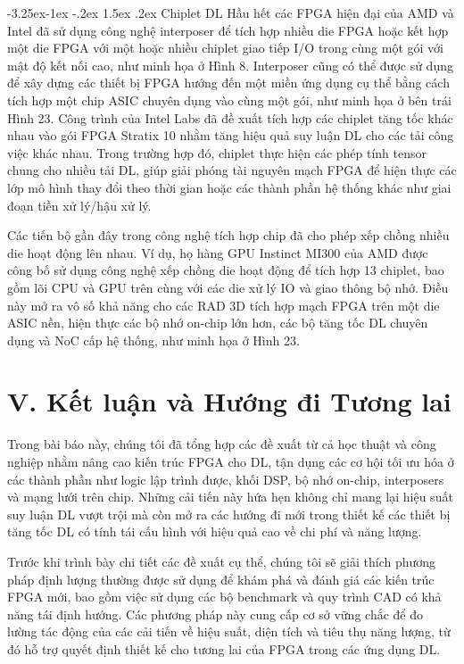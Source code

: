 \documentclass[a4paper]{article}
\makeatletter
\newcounter {subsubsubsection}[subsubsection]
\newcommand\subsubsubsection{\@startsection{subsubsubsection}{4}{\z@}%
                                     {-3.25ex\@plus -1ex \@minus -.2ex}%
                                     {1.5ex \@plus .2ex}%
                                     {\normalfont\normalsize\bfseries}}
\makeatother
\begin{document}
\subsubsubsection{Chiplet DL}
Hầu hết các FPGA hiện đại của AMD và Intel đã sử dụng công nghệ interposer để tích hợp nhiều die FPGA hoặc kết hợp một die FPGA với một hoặc nhiều chiplet giao tiếp I/O trong cùng một gói với mật độ kết nối cao, như minh họa ở Hình 8. Interposer cũng có thể được sử dụng để xây dựng các thiết bị FPGA hướng đến một miền ứng dụng cụ thể bằng cách tích hợp một chip ASIC chuyên dụng vào cùng một gói, như minh họa ở bên trái Hình 23. Công trình của Intel Labs đã đề xuất tích hợp các chiplet tăng tốc khác nhau vào gói FPGA Stratix 10 nhằm tăng hiệu quả suy luận DL cho các tải công việc khác nhau. Trong trường hợp đó, chiplet thực hiện các phép tính tensor chung cho nhiều tải DL, giúp giải phóng tài nguyên mạch FPGA để hiện thực các lớp mô hình thay đổi theo thời gian hoặc các thành phần hệ thống khác như giai đoạn tiền xử lý/hậu xử lý.

Các tiến bộ gần đây trong công nghệ tích hợp chip đã cho phép xếp chồng nhiều die hoạt động lên nhau. Ví dụ, họ hàng GPU Instinct MI300 của AMD được công bố sử dụng công nghệ xếp chồng die hoạt động để tích hợp 13 chiplet, bao gồm lõi CPU và GPU trên cùng với các die xử lý IO và giao thông bộ nhớ. Điều này mở ra vô số khả năng cho các RAD 3D tích hợp mạch FPGA trên một die ASIC nền, hiện thực các bộ nhớ on-chip lớn hơn, các bộ tăng tốc DL chuyên dụng và NoC cấp hệ thống, như minh họa ở Hình 23.

\section{V. Kết luận và Hướng đi Tương lai}

Trong bài báo này, chúng tôi đã tổng hợp các đề xuất từ cả học thuật và công nghiệp nhằm nâng cao kiến trúc FPGA cho DL, tận dụng các cơ hội tối ưu hóa ở các thành phần như logic lập trình được, khối DSP, bộ nhớ on-chip, interposers và mạng lưới trên chip. Những cải tiến này hứa hẹn không chỉ mang lại hiệu suất suy luận DL vượt trội mà còn mở ra các hướng đi mới trong thiết kế các thiết bị tăng tốc DL có tính tái cấu hình với hiệu quả cao về chi phí và năng lượng.

Trước khi trình bày chi tiết các đề xuất cụ thể, chúng tôi sẽ giải thích phương pháp định lượng thường được sử dụng để khám phá và đánh giá các kiến trúc FPGA mới, bao gồm việc sử dụng các bộ benchmark và quy trình CAD có khả năng tái định hướng. Các phương pháp này cung cấp cơ sở vững chắc để đo lường tác động của các cải tiến về hiệu suất, diện tích và tiêu thụ năng lượng, từ đó hỗ trợ quyết định thiết kế cho tương lai của FPGA trong các ứng dụng DL.
\end{document}
